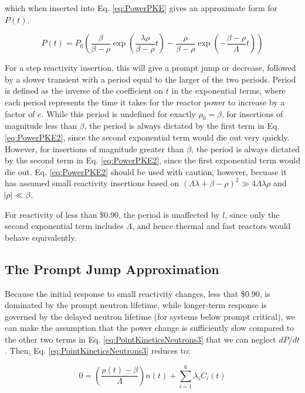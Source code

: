 \documentclass[10pt]{article}
\begin{document}
\begin{flushleft}
which when inserted into Eq. \ref{eq:PowerPKE} gives an approximate form for \(P(t)\).

\begin{equation}
\label{eq:PowerPKE2}
P(t)=P_0\left(\frac{\beta}{\beta-\rho}\exp{\left(\frac{\lambda\rho}{\beta-\rho} t\right)} - \frac{\rho}{\beta-\rho}\exp{\left(-\frac{\beta-\rho}{\Lambda} t\right)}\right)
\end{equation} 

For a step reactivity insertion, this will give a prompt jump or decrease, followed by a slower transient with a period equal to the larger of the two periods. Period is defined as the inverse of the coefficient on \(t\) in the exponential terms, where each period represents the time it takes for the reactor power to increase by a factor of \(e\). While this period is undefined for exactly \(\rho_0=\beta\), for insertions of magnitude less than \(\beta\), the period is always dictated by the first term in Eq. \ref{eq:PowerPKE2}, since the second exponential term would die out very quickly. However, for insertions of magnitude greater than \(\beta\), the period is always dictated by the second term in Eq. \ref{eq:PowerPKE2}, since the first exponential term would die out. Eq. \ref{eq:PowerPKE2} should be used with caution, however, becuase it has assumed small reactivity insertions based on \((\Lambda\lambda+\beta-\rho)^2 \gg 4\Lambda\lambda\rho\) and \(\abs{\rho}\ll\beta\). 

For reactivity of less than \$0.90, the period is unaffected by \(l\), since only the second exponential term includes \(\Lambda\), and hence thermal and fast reactors would behave equivalently.


\subsection{The Prompt Jump Approximation}

Because the initial response to small reactivity changes, less that \$0.90, is dominated by the prompt neutron lifetime, while longer-term response is governed by the delayed neutron lifetime (for systems below prompt critical), we can make the assumption that the power change is sufficiently slow compared to the other two terms in Eq. \ref{eq:PointKineticsNeutrons3} that we can neglect \(dP/dt\). Then, Eq. \ref{eq:PointKineticsNeutrons3} reduces to:

\begin{equation}
\label{eq:PromptJump1}
0=\left(\frac{\rho(t)-\beta}{\Lambda}\right)n(t)+\sum_{i=1}^{6}\lambda_iC_i(t)
\end{equation} 


\end{flushleft}
\end{document}
